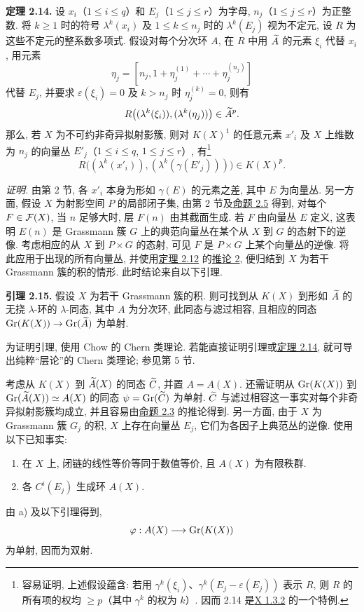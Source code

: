 \textbf{定理 2.14.} 设 $x_i$（$1\leq i\leq q$）和 $E_j$（$1\leq j\leq r$）为字母, $n_j$（$1\leq j\leq r$）为正整数. 将 $k\geq 1$ 时的符号 $\lambda^k(x_i)$ 及 $1\leq k\leq n_j$ 时的 $\lambda^k(E_j)$ 视为不定元, 设 $R$ 为这些不定元的整系数多项式. 假设对每个分次环 $A$, 在 $R$ 中用 $\widetilde A$ 的元素 $\xi_i$ 代替 $x_i$, 用元素
\[
 \eta_j=[n_j,1+\eta_j^{(1)}+\cdots+\eta_j^{(n_j)}]
\]
代替 $E_j$, 并要求 $\varepsilon(\xi_i)=0$ 及 $k>n_j$ 时 $\eta_j^{(k)}=0$, 则有
\[
 R\bigl((\lambda^k(\xi_i)),(\lambda^k(\eta_j))\bigr)\in \widetilde A^p.
\]
那么, 若 $X$ 为不可约非奇异拟射影簇, 则对 $K(X)^1$ 的任意元素 $x'_i$ 及 $X$ 上维数为 $n_j$ 的向量丛 $E'_j$（$1\leq i\leq q$, $1\leq j\leq r$）, 有\footnote{容易证明, 上述假设蕴含: 若用 $\gamma^k(\xi_i)$、$\gamma^k(E_j-\varepsilon(E_j))$ 表示 $R$, 则 $R$ 的所有项的权均 $\geq p$（其中 $\gamma^k$ 的权为 $k$）. 因而 2.14 是\hyperlink{sga6.e10.thm.1-3-2}{X 1.3.2} 的一个特例.}
\begin{equation}\tag{*}
 R\bigl((\lambda^k(x'_i)),(\lambda^k(\gamma(E'_j)))\bigr)\in K(X)^p.
\end{equation}


\emph{证明.} 由第 2 节, 各 $x'_i$ 本身为形如 $\gamma(E)$ 的元素之差, 其中 $E$ 为向量丛. 另一方面, 假设 $X$ 为射影空间 $P$ 的局部闭子集, 由第 2 节及\hyperlink{sga6.e00.prop.2-5}{命题 2.5} 得到, 对每个 $F\in\mathcal F(X)$, 当 $n$ 足够大时, 层 $F(n)$ 由其截面生成. 若 $F$ 由向量丛 $E$ 定义, 这表明 $E(n)$ 是 Grassmann 簇 $G$ 上的典范向量丛在某个从 $X$ 到 $G$ 的态射下的逆像. 考虑相应的从 $X$ 到 $P\times G$ 的态射, 可见 $F$ 是 $P\times G$ 上某个向量丛的逆像. 将此应用于出现的所有向量丛, 并使用\hyperlink{sga6.e00.thm.2-12}{定理 2.12} 的\hyperlink{sga6.e00.cor.2.occ3}{推论 2}, 便归结到 $X$ 为若干 Grassmann 簇的积的情形. 此时结论来自以下引理.

\textbf{引理 2.15.} 假设 $X$ 为若干 Grassmann 簇的积. 则可找到从 $K(X)$ 到形如 $\widetilde A$ 的无挠 $\lambda$-环的 $\lambda$-同态, 其中 $A$ 为分次环, 此同态与滤过相容, 且相应的同态 $\operatorname{Gr}(K(X))\to\operatorname{Gr}(\widetilde A)$ 为单射.

为证明引理, 使用 Chow 的 Chern 类理论. 若能直接证明引理或\hyperlink{sga6.e00.thm.2-14}{定理 2.14}, 就可导出纯粹“层论”的 Chern 类理论; 参见第 5 节.

考虑从 $K(X)$ 到 $\widetilde A(X)$ 的同态 $\widetilde C$, 并置 $A=A(X)$. 还需证明从 $\operatorname{Gr}(K(X))$ 到 $\operatorname{Gr}(\widetilde A(X))\simeq A(X)$ 的同态 $\psi=\operatorname{Gr}(\widetilde C)$ 为单射. $\widetilde C$ 与滤过相容这一事实对每个非奇异拟射影簇均成立, 并且容易由\hyperlink{sga6.e00.prop.2-3}{命题 2.3} 的推论得到. 另一方面, 由于 $X$ 为 Grassmann 簇 $G_j$ 的积, $X$ 上存在向量丛 $E_j$, 它们为各因子上典范丛的逆像. 使用以下已知事实:
\begin{enumerate}[label=\alph*)]
\item 在 $X$ 上, 闭链的线性等价等同于数值等价, 且 $A(X)$ 为有限秩群.
\item 各 $C^i(E_j)$ 生成环 $A(X)$.
\end{enumerate}
由 a) 及以下引理得到,
\[
 \varphi:A(X)\longrightarrow \operatorname{Gr}(K(X))
\]
为单射, 因而为双射.

